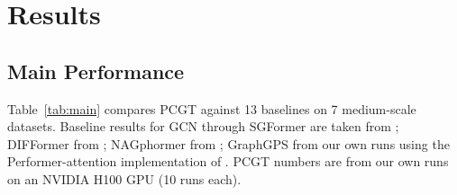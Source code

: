 \section{Results}
\label{sec:results}

\subsection{Main Performance}

Table~\ref{tab:main} compares PCGT against 13 baselines on 7 medium-scale datasets. Baseline results for GCN through SGFormer are taken from \citet{wu2023sgformer}; DIFFormer from \citet{wu2023difformer}; NAGphormer from \citet{chen2023nagphormer}; GraphGPS from our own runs using the Performer-attention implementation of \citet{rampasek2022graphgps}. PCGT numbers are from our own runs on an NVIDIA H100 GPU (10 runs each).

